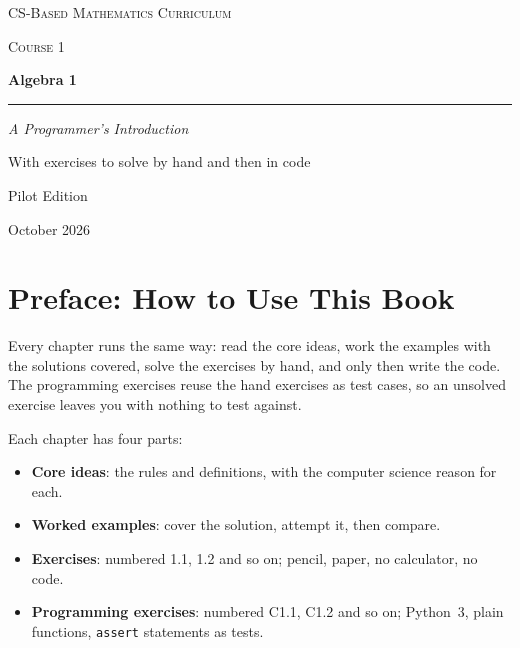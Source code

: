 \documentclass[11pt,letterpaper,openany]{book}
\newcounter{example}[chapter]
\begin{document}
\frontmatter

\begin{titlepage}
\centering
\vspace*{1.6in}
{\color{slate}\scshape\large CS-Based Mathematics Curriculum\par}
{\color{slate}\scshape\large Course 1\par}
\vspace{0.6in}
{\color{navy}\bfseries\fontsize{48}{54}\selectfont Algebra 1\par}
\vspace{0.3in}
{\color{navy}\rule{0.6\textwidth}{1.2pt}}\par
\vspace{0.3in}
{\Large\itshape A Programmer's Introduction\par}
\vspace{0.25in}
{\large With exercises to solve by hand and then in code\par}
\vfill
{\large Pilot Edition\par}
{\large October 2026\par}
\vspace{0.6in}
\end{titlepage}

\pagestyle{plain}

\chapter*{Preface: How to Use This Book}

Every chapter runs the same way: read the core ideas, work the examples with the solutions covered, solve the exercises by hand, and only then write the code. The programming exercises reuse the hand exercises as test cases, so an unsolved exercise leaves you with nothing to test against.

Each chapter has four parts:

\begin{itemize}
\item \textbf{Core ideas}: the rules and definitions, with the computer science reason for each.
\item \textbf{Worked examples}: cover the solution, attempt it, then compare.
\item \textbf{Exercises}: numbered 1.1, 1.2 and so on; pencil, paper, no calculator, no code.
\item \textbf{Programming exercises}: numbered C1.1, C1.2 and so on; Python~3, plain functions, \lstinline!assert! statements as tests.
\end{itemize}
\end{document}
